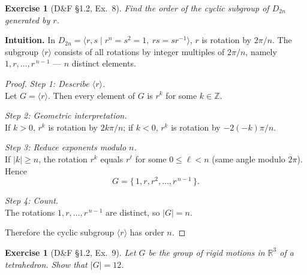 \documentclass[12pt]{article}
\newtheorem{exercise}[theorem]{Exercise}
\theoremstyle{definition}
\begin{document}
\newpage

\begin{exercise}[D\&F §1.2, Ex.~8]
Find the order of the cyclic subgroup of $D_{2n}$ generated by $r$.
\end{exercise}

\dotfill

\noindent
\textbf{Intuition.}
In $D_{2n}=\langle r,s\mid r^{n}=s^{2}=1,\ rs=sr^{-1}\rangle$, $r$ is rotation by $2\pi/n$.
The subgroup $\langle r\rangle$ consists of all rotations by integer multiples of $2\pi/n$,
namely $1,r,\dots,r^{\,n-1}$ — $n$ distinct elements.

\dotfill

\begin{proof}
\noindent\emph{Step 1: Describe $\langle r\rangle$.}\\

\noindent
Let $G=\langle r\rangle$. Then every element of $G$ is $r^{k}$ for some $k\in\mathbb Z$.

\dotfill

\noindent\emph{Step 2: Geometric interpretation.}\\

\noindent
If $k>0$, $r^{k}$ is rotation by $2k\pi/n$; if $k<0$, $r^{k}$ is rotation by $-2(-k)\pi/n$.

\dotfill

\noindent\emph{Step 3: Reduce exponents modulo $n$.}\\

\noindent
If $|k|\ge n$, the rotation $r^{k}$ equals $r^{\ell}$ for some $0\le \ell<n$ (same angle modulo $2\pi$).
Hence
\[
G=\{\,1,r,r^{2},\dots,r^{\,n-1}\,\}.
\]

\dotfill

\noindent\emph{Step 4: Count.}\\

\noindent
The rotations $1,r,\dots,r^{\,n-1}$ are distinct, so $|G|=n$.

\dotfill

Therefore the cyclic subgroup $\langle r\rangle$ has order $n$.
\end{proof}

\newpage

\begin{exercise}[D\&F §1.2, Ex.~9]
Let $G$ be the group of rigid motions in $\mathbb{R}^3$ of a tetrahedron. Show that $\lvert G\rvert=12$.
\end{exercise}
\end{document}
